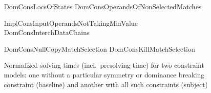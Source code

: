 \begin{figure}
  \centering

                      {DomConsLocsOfStates}%
  \hfill%
                      {DomConsOperandsOfNonSelectedMatches}

  \vspace{\betweensubfigures}

                      {ImplConsInputOperandsNotTakingMinValue}%
  \hfill%
                      {DomConsInterchDataChains}

  \vspace{\betweensubfigures}

                      {DomConsNullCopyMatchSelection}%
  \hfill%
                      {DomConsKillMatchSelection}

  \caption[%
            Set of plots for evaluating each symmetry or dominance breaking
            constraint's impact on solving time%
          ]%
          {%
            Normalized solving times (incl.\ presolving time) for two
            constraint models: one without a particular symmetry or dominance
            breaking constraint (baseline) and another with all such
            constraints (subject)%
          }
\end{figure}

